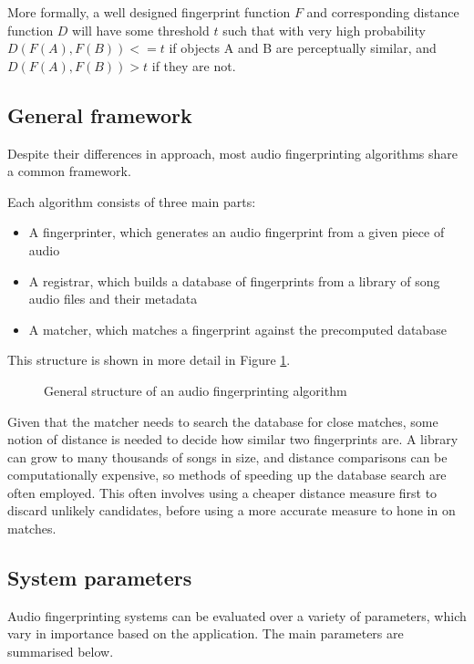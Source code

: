 \documentclass[12pt,a4paper,twoside,openright]{report}
\begin{document}
More formally, a well designed fingerprint function $F$ and corresponding distance function $D$ will have some threshold $t$ such that with very high probability $D(F(A),F(B)) <= t$ if objects A and B are perceptually similar, and $D(F(A),F(B)) > t$ if they are not.


\subsection{General framework}

Despite their differences in approach, most audio fingerprinting algorithms share a common framework.

Each algorithm consists of three main parts: 

\begin{itemize}
  \item A fingerprinter, which generates an audio fingerprint from a given piece of audio
  \item A registrar, which builds a database of fingerprints from a library of song audio files and their metadata
  \item A matcher, which matches a fingerprint against the precomputed database
\end{itemize}

This structure is shown in more detail in Figure \ref{fig:generalframework}. 

\begin{figure}[h]
  \centering
  
  \caption{General structure of an audio fingerprinting algorithm}
  \label{fig:generalframework}
\end{figure}

Given that the matcher needs to search the database for close matches, some notion of distance is needed to decide how similar two fingerprints are. A library can grow to many thousands of songs in size, and distance comparisons can be computationally expensive, so methods of speeding up the database search are often employed. This often involves using a cheaper distance measure first to discard unlikely candidates, before using a more accurate measure to hone in on matches.


\subsection{System parameters}
\label{section:systemparams}

Audio fingerprinting systems can be evaluated over a variety of parameters, which vary in importance based on the application. The main parameters are summarised below.
\end{document}
